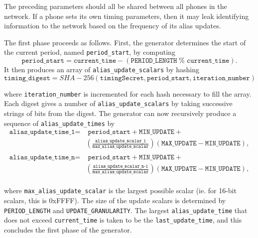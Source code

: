 \documentclass[11pt]{article}
\begin{document}
The preceding parameters should all be shared between all phones in the network. If a phone sets its own timing parameters, then it may leak identifying information to the network based on the frequency of its alias updates.

	The first phase proceeds as follows. First, the generator determines the start of the current period, named \texttt{period_start}, by computing 
\begin{equation*}
	\texttt{period_start} = \texttt{current_time} - (\texttt{PERIOD_LENGTH}\; \% \;\texttt{current_time}). 
\end{equation*}
It then produces an array of \texttt{alias_update_scalars} by hashing 
\begin{equation*}
	\texttt{timing_digest} = SHA-256(\texttt{timingSecret}, \texttt{period_start}, \texttt{iteration_number})
\end{equation*}

where \texttt{iteration_number} is incremented for each hash necessary to fill the array. Each digest gives a number of \texttt{alias_update_scalars} by taking successive strings of bits from the digest. The generator can now recursively produce a sequence of \texttt{alias_update_times} by
\begin{equation*}
\begin{split}
\texttt{alias_update_time_1} =  &\;  \texttt{period_start} + \texttt{MIN_UPDATE}  + \\ 
	& (\frac{\texttt{alias_update_scalar_1}}{\texttt{max_alias_update_scalar}}) (\texttt{MAX_UPDATE} - \texttt{MIN_UPDATE}), \\
\end{split}
\end{equation*}
\begin{equation*}
\begin{split}
	\texttt{alias_update_time_n} =  &\;  \texttt{period_start} + \texttt{MIN_UPDATE}  + \\ 
	& (\frac{\texttt{alias_update_scalar_n-1}}{\texttt{max_alias_update_scalar}}) (\texttt{MAX_UPDATE} - \texttt{MIN_UPDATE}), \\
\end{split}
\end{equation*}
	  
where \texttt{max_alias_update_scalar} is the largest possible scalar (ie. for 16-bit scalars, this is 0xFFFF). The size of the update scalars is determined by \texttt{PERIOD_LENGTH} and \texttt{UPDATE_GRANULARITY}. The largest \texttt{alias_update_time} that does not exceed \texttt{current_time} is taken to be the \texttt{last_update_time}, and this concludes the first phase of the generator.
\end{document}
